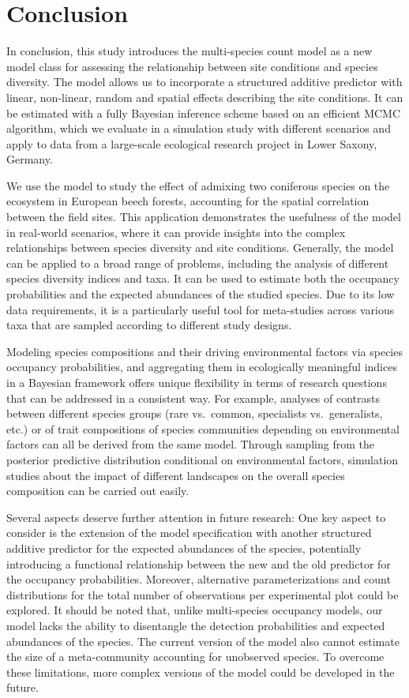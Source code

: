 \documentclass{article}
\begin{document}
\section{Conclusion}
\label{sec:conclusion}

In conclusion, this study introduces the multi-species count model as a new model class for assessing the relationship between site conditions and species diversity. The model allows us to incorporate a structured additive predictor with linear, non-linear, random and spatial effects describing the site conditions. It can be estimated with a fully Bayesian inference scheme based on an efficient MCMC algorithm, which we evaluate in a simulation study with different scenarios and apply to data from a large-scale ecological research project in Lower Saxony, Germany.

We use the model to study the effect of admixing two coniferous species on the ecosystem in European beech forests, accounting for the spatial correlation between the field sites. This application demonstrates the usefulness of the model in real-world scenarios, where it can provide insights into the complex relationships between species diversity and site conditions. Generally, the model can be applied to a broad range of problems, including the analysis of different species diversity indices and taxa. It can be used to estimate both the occupancy probabilities and the expected abundances of the studied species. Due to its low data requirements, it is a particularly useful tool for meta-studies across various taxa that are sampled according to different study designs.

Modeling species compositions and their driving environmental factors via species occupancy probabilities, and aggregating them in ecologically meaningful indices in a Bayesian framework offers unique flexibility in terms of research questions that can be addressed in a consistent way. For example, analyses of contrasts between different species groups (rare vs.~common, specialists vs.~generalists, etc.) or of trait compositions of species communities depending on environmental factors can all be derived from the same model. Through sampling from the posterior predictive distribution conditional on environmental factors, simulation studies about the impact of different landscapes on the overall species composition can be carried out easily.

Several aspects deserve further attention in future research: One key aspect to consider is the extension of the model specification with another structured additive predictor for the expected abundances of the species, potentially introducing a functional relationship between the new and the old predictor for the occupancy probabilities. Moreover, alternative parameterizations and count distributions for the total number of observations per experimental plot could be explored. It should be noted that, unlike multi-species occupancy models, our model lacks the ability to disentangle the detection probabilities and expected abundances of the species. The current version of the model also cannot estimate the size of a meta-community accounting for unobserved species. To overcome these limitations, more complex versions of the model could be developed in the future.
\end{document}
